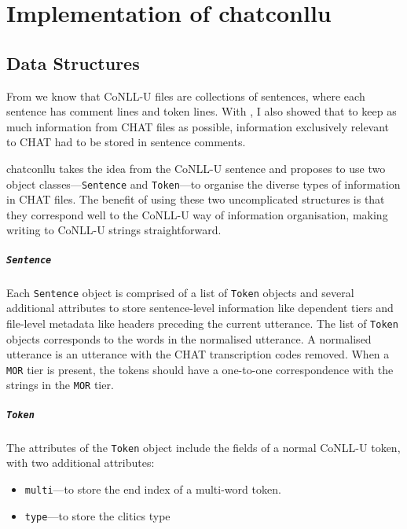 \chapter{Implementation of chatconllu} %

\label{Chapter3} %

\section{Data Structures}
From  we know that CoNLL-U files are collections of sentences, where each sentence has comment lines and token lines. With , I also showed that to keep as much information from CHAT files as possible, information exclusively relevant to CHAT had to be stored in sentence comments.

chatconllu takes the idea from the CoNLL-U sentence and proposes to use two object classes---\texttt{Sentence} and \texttt{Token}---to organise the diverse types of information in CHAT files. The benefit of using these two uncomplicated structures is that they correspond well to the CoNLL-U way of information organisation, making writing to CoNLL-U strings straightforward.

\paragraph{\texttt{Sentence}}

Each \texttt{Sentence} object is comprised of a list of \texttt{Token} objects and several additional attributes to store sentence-level information like dependent tiers and file-level metadata like headers preceding the current utterance. The list of \texttt{Token} objects corresponds to the words in the normalised utterance. A normalised utterance is an utterance with the CHAT transcription codes removed. When a \texttt{MOR} tier is present, the tokens should have a one-to-one correspondence with the strings in the \texttt{MOR} tier.
\paragraph{\texttt{Token}}

The attributes of the \texttt{Token} object include the  fields of a normal CoNLL-U token, with two additional attributes:
\begin{itemize}
	\item \texttt{multi}---to store the end index of a multi-word token.
	\item \texttt{type}---to store the clitics type
\end{itemize}

